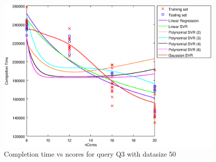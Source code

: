 
\begin {figure}[hbtp]
\centering
\includegraphics[width=\textwidth]{output/Q3_50_ONLY_1_OVER_NCORES/plot_Q3_50.eps}
\caption{Completion time vs ncores for query Q3 with datasize 50}
\label{fig:all_linear_Q3_50}
\end {figure}
